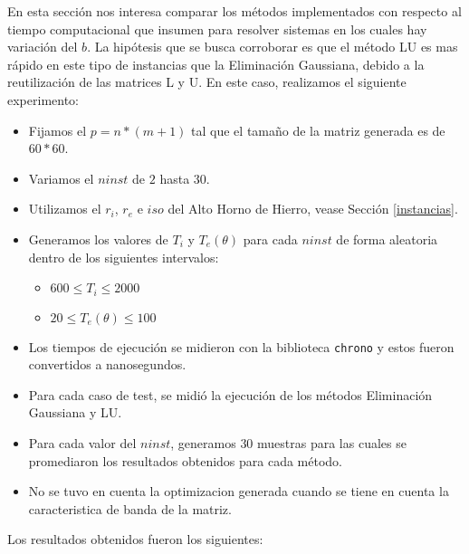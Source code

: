 En esta sección nos interesa comparar los métodos implementados con respecto al tiempo computacional que insumen para resolver sistemas en los cuales hay variación del $b$.
La hipótesis que se busca corroborar es que el método LU es mas rápido en este tipo de instancias que la Eliminación Gaussiana, debido a la reutilización de las matrices L y U.
\newline
\newline
En este caso, realizamos el siguiente experimento:
\begin{itemize}
    \item Fijamos el $p = n*(m+1)$ tal que el tamaño de la matriz generada es de $60*60$.
    \item Variamos el $ninst$ de $2$ hasta $30$.
    \item Utilizamos el $r_i$, $r_e$ e $iso$ del Alto Horno de Hierro, vease Sección \ref{instancias}.
    \item Generamos los valores de $T_{i}$ y $T_{e}(\theta)$ para cada $ninst$ de forma aleatoria dentro de los siguientes intervalos:
    \begin{itemize}
      \item $600 \leq T_{i} \leq 2000$
      \item $20 \leq T_{e}(\theta) \leq 100$
    \end{itemize}
    \item Los tiempos de ejecución se midieron con la biblioteca \texttt{chrono} y estos fueron convertidos a nanosegundos.
    \item Para cada caso de test, se midió la ejecución de los métodos Eliminación Gaussiana y LU.
    \item Para cada valor del $ninst$, generamos $30$ muestras para las cuales se promediaron los resultados obtenidos para cada método.
    \item No se tuvo en cuenta la optimizacion generada cuando se tiene en cuenta la caracteristica de banda de la matriz.
\end{itemize}

Los resultados obtenidos fueron los siguientes:

\begin{center}

\end{center}

